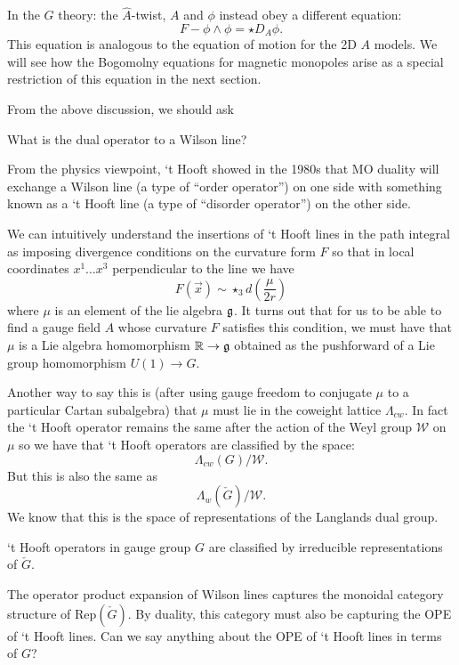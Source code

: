 	In the $G$ theory: the $\hat A$-twist, $A$ and $\phi$ instead obey a different equation:
	\begin{equation}
		F - \phi \wedge \phi = \star D_A \phi.
	\end{equation}
	This equation is analogous to the equation of motion for the 2D $A$ models. We will see how the Bogomolny equations for magnetic monopoles arise as a special restriction of this equation in the next section.

	From the above discussion, we should ask 
	\begin{ques}
		What is the dual operator to a Wilson line?
	\end{ques}
	From the physics viewpoint, `t Hooft showed in the 1980s that MO duality will exchange a Wilson line (a type of ``order operator'') on one side with something known as a `t Hooft line (a type of ``disorder operator'') on the other side.
	
	We can intuitively understand the insertions of `t Hooft lines in the path integral as imposing divergence conditions on the curvature form $F$ so that in local coordinates $x^1 \dots x^3$ perpendicular to the line we have
		\begin{equation}\label{eq:Amod}
			F(\vec{x}) \sim \star_3 d\left( \frac{\mu}{2r} \right)
		\end{equation}
		where $\mu$ is an element of the lie algebra $\frak g$. It turns out that for us to be able to find a gauge field $A$ whose curvature $F$ satisfies this condition, we must have that $\mu$ is a Lie algebra homomorphism $\mathbb R \to \frak g$ obtained as the pushforward of a Lie group homomorphism $U(1) \to G$.
		
		Another way to say this is (after using gauge freedom to conjugate $\mu$ to a particular Cartan subalgebra) that $\mu$ must lie in the coweight lattice $\Lambda_{cw}$. In fact the `t Hooft operator remains the same after the action of the Weyl group $\mathcal W$ on $\mu$ so we have that `t Hooft operators are classified by the space:
			\[
				\Lambda_{cw}(G)/\mathcal W.
			\]
			But this is also the same as 
			\[
				\Lambda_{w}(\check G)/\mathcal W.	
			\]
			We know that this is the space of representations of the Langlands dual group. 
			\begin{prop}
				`t Hooft operators in gauge group $G$ are classified by irreducible representations of $\check G$.
			\end{prop}
	
			The operator product expansion of Wilson lines captures the monoidal category structure of $\mathrm{Rep}(\check G)$. By duality, this category must also be capturing the OPE of `t Hooft lines. Can we say anything about the OPE of `t Hooft lines in terms of $G$?

